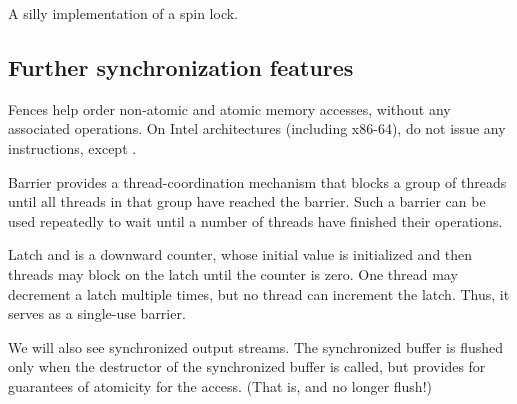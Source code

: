 \raggedbottom
\begin{codebox}[]{\href{https://godbolt.org/z/}{\ExternalLink}}
\footnotesize A silly implementation of a spin lock.
\tcblower
{}
\end{codebox}

\subsection{Further synchronization features}

Fences help order non-atomic and atomic memory accesses, without any associated operations. On Intel architectures (including x86-64),  do not issue any instructions, except .

Barrier provides a thread-coordination mechanism that blocks a group of threads until all threads in that group have reached the barrier. Such a barrier can be used repeatedly to wait until a number of threads have finished their operations. 

Latch and is a downward counter, whose initial value is initialized and then threads may block on the latch until the counter is  zero. One thread may decrement a latch multiple times, but no thread can increment the latch. Thus, it serves as a single-use barrier.

We will also see synchronized output streams. The synchronized buffer is flushed only when the destructor of the synchronized buffer is called, but provides for guarantees of atomicity for the access. (That is,  and  no longer flush!)